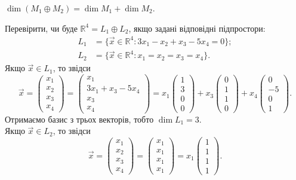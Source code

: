 \documentclass{math_library}
\begin{document}
	\begin{corollary}
	$\dim{(M_1  \oplus  M_2)} = \dim{M_1} + \dim{M_2}$.
	\end{corollary}
	
	\begin{example}
	Перевірити, чи буде $\mathbb{R}^4 = L_1  \oplus  L_2$, якщо задані відповідні підпростори:
	\begin{align*}
	L_1 & = \{\vec{x} \in \mathbb{R}^4: 3x_1 - x_2 + x_3 - 5x_4 = 0\}; \\
	L_2 & = \{\vec{x} \in \mathbb{R}^4: x_1 = x_2 = x_3 = x_4\}.
	\end{align*}
	Якщо $\vec{x} \in L_1$, то звідси 
	\[
	\vec{x} = \begin{pmatrix} x_1 \\ x_2 \\ x_3 \\ x_4 \end{pmatrix} = \begin{pmatrix}
	x_1 \\ 3x_1+x_3-5x_4 \\ x_3 \\ x_4
	\end{pmatrix} = x_1 \begin{pmatrix}
	1 \\ 3 \\ 0 \\ 0
	\end{pmatrix} + x_3\begin{pmatrix}
	0 \\ 1 \\ 1 \\ 0
	\end{pmatrix} +  x_4\begin{pmatrix}
	0 \\ -5 \\ 0 \\ 1
	\end{pmatrix}.
	\]
	Отримаємо базис з трьох векторів, тобто $\dim L_1 = 3$.\\
	Якщо $\vec{x} \in L_2$, то звідси
	\[ 
	\vec{x} = \begin{pmatrix} x_1 \\ x_2 \\ x_3 \\ x_4 \end{pmatrix} = \begin{pmatrix} x_1 \\ x_1 \\ x_1 \\ x_1 \end{pmatrix} = x_1 \begin{pmatrix} 1 \\ 1 \\ 1 \\ 1 \end{pmatrix}.
\]
\end{example}
\end{document}
